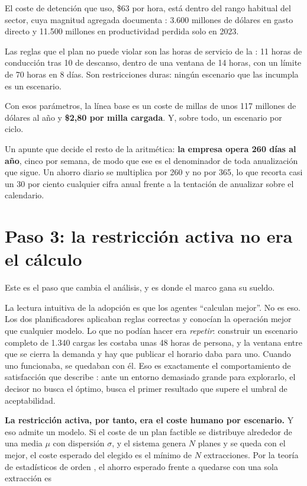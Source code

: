 \documentclass[11pt,letterpaper]{article}
\begin{document}
El coste de detención que uso, \$63 por hora, está dentro del rango
habitual del sector, cuya magnitud agregada documenta
\textcite{atridetencion2024}: 3.600 millones de dólares en gasto directo y
11.500 millones en productividad perdida solo en 2023.

Las reglas que el plan no puede violar son las horas de servicio de la
\textcite{fmcsahos}: 11 horas de conducción tras 10 de descanso, dentro de una
ventana de 14 horas, con un límite de 70 horas en 8 días. Son restricciones
duras: ningún escenario que las incumpla es un escenario.

Con esos parámetros, la línea base es un coste de millas de unos 117 millones
de dólares al año y \textbf{\$2,80 por milla cargada}. Y, sobre todo, un
escenario por ciclo.

Un apunte que decide el resto de la aritmética: \textbf{la empresa opera 260
días al año}, cinco por semana, de modo que ese es el denominador de toda
anualización que sigue. Un ahorro diario se multiplica por 260 y no por 365,
lo que recorta casi un 30 por ciento cualquier cifra anual frente a la
tentación de anualizar sobre el calendario.

\section{Paso 3: la restricción activa no era el cálculo}
\label{sec:restriccion}

Este es el paso que cambia el análisis, y es donde el marco gana su sueldo.

La lectura intuitiva de la adopción es que los agentes \enquote{calculan
mejor}. No es eso. Los dos planificadores aplicaban reglas correctas y
conocían la operación mejor que cualquier modelo. Lo que no podían hacer era
\emph{repetir}: construir un escenario completo de 1.340 cargas les costaba
unas 48 horas de persona, y la ventana entre que se cierra la demanda y hay
que publicar el horario daba para uno. Cuando uno funcionaba, se quedaban con
él. Eso es exactamente el comportamiento de satisfacción que describe
\textcite{simon1956}: ante un entorno demasiado grande para explorarlo, el
decisor no busca el óptimo, busca el primer resultado que supere el umbral de
aceptabilidad.

\textbf{La restricción activa, por tanto, era el coste humano por escenario.}
Y eso admite un modelo. Si el coste de un plan factible se distribuye
alrededor de una media $\mu$ con dispersión $\sigma$, y el sistema genera $N$
planes y se queda con el mejor, el coste esperado del elegido es el mínimo de
$N$ extracciones. Por la teoría de estadísticos de orden
\parencite{david2003}, el ahorro esperado frente a quedarse con una sola
extracción es
\end{document}
